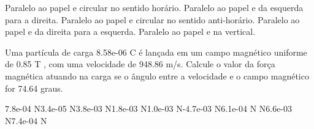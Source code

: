 \documentclass[12pt, addpoints]{exam}
\begin{document}
\begin{questions}
\begin{multicols*}{2}
\begin{choices}
\choice Paralelo ao papel e circular no sentido horário. 
\choice Paralelo ao papel e da esquerda para a direita. 
\choice Paralelo ao papel e circular no sentido anti-horário. 
\choice Paralelo ao papel e da direita para a esquerda. 
\choice Paralelo ao papel e na vertical. 
\end{choices}
\question Uma partícula de carga 8.58e-06 C é lançada em um campo magnético uniforme de    0.85 T , com uma velocidade de 948.86 m/s. Calcule o valor da força magnética atuando na carga se o ângulo entre a velocidade e o campo magnético for   74.64 graus.

\begin{oneparchoices}
\choice 7.8e-04 N\choice 3.4e-05 N\choice 3.8e-03 N\choice 1.8e-03 N\choice 1.0e-03 N\choice -4.7e-03 N\choice 6.1e-04 N N\choice 6.6e-03 N\choice 7.4e-04 N
\end{oneparchoices}\end{multicols*}
\end{questions}
\newpage
\end{document}
